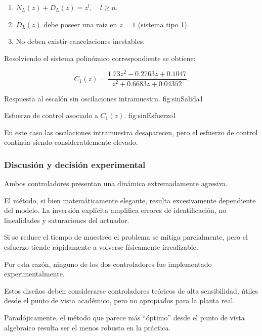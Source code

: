 \begin{enumerate}
	\item \(N_L(z) + D_L(z) = z^l,\quad l \ge n\).
	\item \(D_L(z)\) debe poseer una raíz en \(z=1\) (sistema tipo 1).
	\item No deben existir cancelaciones inestables.
\end{enumerate}

Resolviendo el sistema polinómico correspondiente se obtiene:

\[
C_1(z)=
\frac{1.73z^2 - 0.2763z + 0.1047}
{z^2 + 0.6683z + 0.04352}.
\]

{Respuesta al escalón sin oscilaciones intramuestra.}
{fig:sinSalida}{1}

{Esfuerzo de control asociado a \(C_1(z)\).}
{fig:sinEsfuerzo}{1}

En este caso las oscilaciones intramuestra desaparecen,
pero el esfuerzo de control continúa siendo
considerablemente elevado.

\subsubsection{Discusión y decisión experimental}

Ambos controladores presentan una dinámica extremadamente agresiva.

El método, si bien matemáticamente elegante,
resulta excesivamente dependiente del modelo.
La inversión explícita amplifica errores de identificación,
no linealidades y saturaciones del actuador.

Si se reduce el tiempo de muestreo
el problema se mitiga parcialmente,
pero el esfuerzo tiende rápidamente a volverse
físicamente irrealizable.

Por esta razón, ninguno de los dos controladores
fue implementado experimentalmente.

Estos diseños deben considerarse
controladores teóricos de alta sensibilidad,
útiles desde el punto de vista académico,
pero no apropiados para la planta real.

Paradójicamente, el método que parece más “óptimo”
desde el punto de vista algebraico
resulta ser el menos robusto en la práctica.
